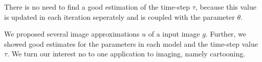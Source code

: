         There is no need to find a good estimation of the time-step $\tau$, because this value is updated in each iteration seperately and is coupled with the parameter $\theta$.



We proposed several image approximations $u$ of a input image $g$. Further, we showed good estimates for the parameters in each model and the time-step value $\tau$. We turn our interest no to one application to imaging, namely cartooning.




